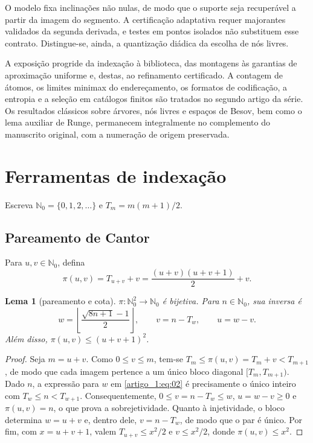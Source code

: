 \documentclass[12pt,a4paper]{article}
\theoremstyle{preciso}
\newtheorem{lema}[teorema]{Lema}
\theoremstyle{definition}
\newcommand{\N}{\mathbb N}
\newcommand{\eqn}[2]{\begin{equation}\label{eq:#1}#2\end{equation}}
\theoremstyle{preciso}
\theoremstyle{preciso}
\theoremstyle{preciso}
\theoremstyle{preciso}
\theoremstyle{definition}
\theoremstyle{preciso}
\theoremstyle{definition}
\theoremstyle{preciso}
\theoremstyle{preciso}
\theoremstyle{definition}
\begin{document}
O modelo fixa inclinações não nulas, de modo que o suporte seja recuperável a partir da imagem do segmento. A certificação adaptativa requer majorantes validados da segunda derivada, e testes em pontos isolados não substituem esse contrato. Distingue-se, ainda, a quantização diádica da escolha de nós livres.

A exposição progride da indexação à biblioteca, das montagens às garantias de aproximação uniforme e, destas, ao refinamento certificado. A contagem de átomos, os limites minimax do endereçamento, os formatos de codificação, a entropia e a seleção em catálogos finitos são tratados no segundo artigo da série. Os resultados clássicos sobre árvores, nós livres e espaços de Besov, bem como o lema auxiliar de Runge, permanecem integralmente no complemento do manuscrito original, com a numeração de origem preservada.
\section{Ferramentas de indexação}
Escreva $\N_0=\{0,1,2,\ldots\}$ e $T_m=m(m+1)/2$.

\subsection{Pareamento de Cantor}
Para $u,v\in\N_0$, defina
\eqn{01}{\pi(u,v)=T_{u+v}+v=\frac{(u+v)(u+v+1)}2+v.}
\begin{lema}[pareamento e cota]\label{map:artigo_1:2.1}
$\pi:\N_0^2\to\N_0$ é bijetiva. Para $n\in\N_0$, sua inversa é
\eqn{02}{w=\left\lfloor\frac{\sqrt{8n+1}-1}{2}\right\rfloor,\qquad v=n-T_w,\qquad u=w-v.}
Além disso, $\pi(u,v)\le(u+v+1)^2$.
\end{lema}
\begin{proof}
Seja $m=u+v$. Como $0\le v\le m$, tem-se $T_m\le\pi(u,v)=T_m+v<T_{m+1}$, de modo que cada imagem pertence a um único bloco diagonal $[T_m,T_{m+1})$. Dado $n$, a expressão para $w$ em \eqref{artigo_1:eq:02} é precisamente o único inteiro com $T_w\le n<T_{w+1}$. Consequentemente, $0\le v=n-T_w\le w$, $u=w-v\ge0$ e $\pi(u,v)=n$, o que prova a sobrejetividade. Quanto à injetividade, o bloco determina $w=u+v$ e, dentro dele, $v=n-T_w$, de modo que o par é único. Por fim, com $x=u+v+1$, valem $T_{u+v}\le x^2/2$ e $v\le x^2/2$, donde $\pi(u,v)\le x^2$.
\end{proof}
\end{document}
